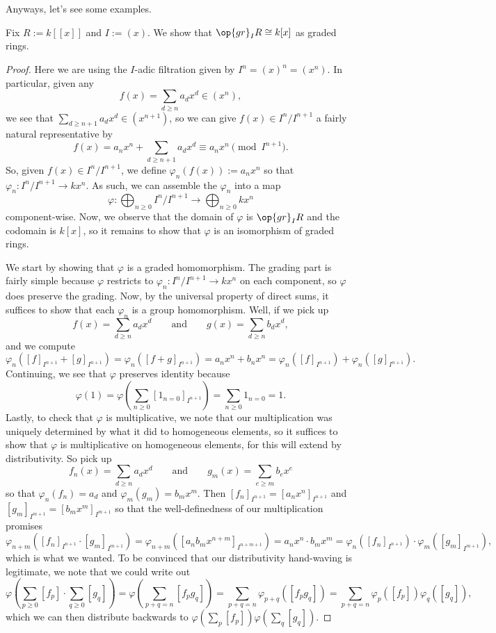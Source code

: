 Anyways, let's see some examples.
\begin{exe} \label{exe:assgradedringex}
	Fix $R:=k[[x]]$ and $I:=(x)$. We show that $\op{gr}_IR\cong k[x]$ as graded rings.
\end{exe}
\begin{proof}
	Here we are using the $I$-adic filtration given by $I^n=(x)^n=\left(x^n\right)$. In particular, given any
	\[f(x)=\sum_{d\ge n}a_dx^d\in\left(x^n\right),\]
	we see that $\sum_{d\ge n+1}a_dx^d\in\left(x^{n+1}\right)$, so we can give $f(x)\in I^n/I^{n+1}$ a fairly natural representative by
	\[f(x)=a_nx^n+\sum_{d\ge n+1}a_dx^d\equiv a_nx^n\pmod{I^{n+1}}.\]
	So, given $f(x)\in I^n/I^{n+1}$, we define $\varphi_n(f(x)):=a_nx^n$ so that $\varphi_n:I^n/I^{n+1}\to kx^n$. As such, we can assemble the $\varphi_n$ into a map
	\[\varphi:\bigoplus_{n\ge0}I^n/I^{n+1}\to\bigoplus_{n\ge0}kx^n\]
	component-wise. Now, we observe that the domain of $\varphi$ is $\op{gr}_IR$ and the codomain is $k[x]$, so it remains to show that $\varphi$ is an isomorphism of graded rings.

	We start by showing that $\varphi$ is a graded homomorphism. The grading part is fairly simple because $\varphi$ restricts to $\varphi_n:I^n/I^{n+1}\to kx^n$ on each component, so $\varphi$ does preserve the grading. Now, by the universal property of direct sums, it suffices to show that each $\varphi_n$ is a group homomorphism. Well, if we pick up
	\[f(x)=\sum_{d\ge n}a_dx^d\qquad\text{and}\qquad g(x)=\sum_{d\ge n}b_dx^d,\]
	and we compute
	\[\varphi_n\left([f]_{I^{n+1}}+[g]_{I^{n+1}}\right)=\varphi_n\left([f+g]_{I^{n+1}}\right)=a_nx^n+b_nx^n=\varphi_n\left([f]_{I^{n+1}}\right)+\varphi_n\left([g]_{I^{n+1}}\right).\]
	Continuing, we see that $\varphi$ preserves identity because
	\[\varphi(1)=\varphi\left(\sum_{n\ge0}[1_{n=0}]_{I^{n+1}}\right)=\sum_{n\ge0}1_{n=0}=1.\]
	Lastly, to check that $\varphi$ is multiplicative, we note that our multiplication was uniquely determined by what it did to homogeneous elements, so it suffices to show that $\varphi$ is multiplicative on homogeneous elements, for this will extend by distributivity. So pick up
	\[f_n(x)=\sum_{d\ge n}a_dx^d\qquad\text{and}\qquad g_m(x)=\sum_{e\ge m}b_ex^e\]
	so that $\varphi_n(f_n)=a_d$ and $\varphi_m(g_m)=b_mx^m$. Then $[f_n]_{I^{n+1}}=\left[a_nx^n\right]_{I^{n+1}}$ and $[g_m]_{I^{m+1}}=\left[b_mx^m\right]_{I^{m+1}}$ so that the well-definedness of our multiplication promises
	\[\varphi_{n+m}\left([f_n]_{I^{n+1}}\cdot[g_m]_{I^{m+1}}\right)=\varphi_{n+m}\left([a_nb_mx^{n+m}]_{I^{n+m+1}}\right)=a_nx^n\cdot b_mx^m=\varphi_n\left([f_n]_{I^{n+1}}\right)\cdot\varphi_m\left([g_m]_{I^{m+1}}\right),\]
	which is what we wanted. To be convinced that our distributivity hand-waving is legitimate, we note that we could write out
	\[\varphi\left(\sum_{p\ge0}[f_p]\cdot\sum_{q\ge0}[g_q]\right)=\varphi\left(\sum_{p+q=n}[f_pg_q]\right)=\sum_{p+q=n}\varphi_{p+q}([f_pg_q])=\sum_{p+q=n}\varphi_p([f_p])\varphi_q([g_q]),\]
	which we can then distribute backwards to $\varphi\left(\sum_p[f_p]\right)\varphi\left(\sum_q[g_q]\right)$.


\end{proof}

